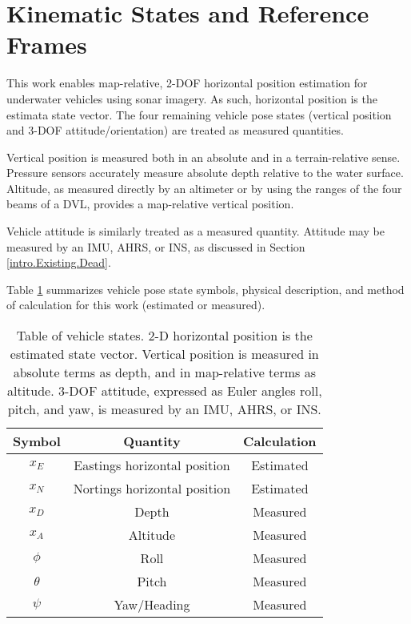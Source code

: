 \section{Kinematic States and Reference Frames}
\label{framework.Frames}

This work enables map-relative, 2-DOF horizontal position estimation for underwater vehicles using sonar imagery.  As such, horizontal position is the estimata state vector.  The four remaining vehicle pose states (vertical position and 3-DOF attitude/orientation) are treated as measured quantities.

Vertical position is measured both in an absolute and in a terrain-relative sense.
Pressure sensors accurately measure absolute depth relative to the water surface.
Altitude, as measured directly by an altimeter or by using the ranges of the four beams of a DVL, provides a map-relative vertical position.

Vehicle attitude is similarly treated as a measured quantity.
Attitude may be measured by an IMU, AHRS, or INS, as discussed in Section \ref{intro.Existing.Dead}.

Table \ref{tab:states} summarizes vehicle pose state symbols, physical description, and method of calculation for this work (estimated or measured).

\begin{table}[h]
\centering
\begin{tabular}{|c|c|c|}
\hline
\textbf{Symbol} & \textbf{Quantity} & \textbf{Calculation} \\ \hline
$x_E$ & Eastings horizontal position & Estimated \\ \hline
$x_N$ & Nortings horizontal position & Estimated \\ \hline
$x_D$ & Depth & Measured \\ \hline
$x_A$ & Altitude & Measured \\ \hline
$\phi$ & Roll & Measured \\ \hline 
$\theta$ & Pitch  & Measured \\ \hline
$\psi$ & Yaw/Heading & Measured \\ \hline
\end{tabular}
\caption{Table of vehicle states. 2-D horizontal position is the estimated state vector. Vertical position is measured in absolute terms as depth, and in map-relative terms as altitude. 3-DOF attitude, expressed as Euler angles roll, pitch, and yaw, is measured by an IMU, AHRS, or INS.}
\label{tab:states}
\end{table}

